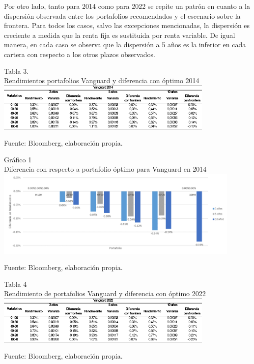 \documentclass[a4paper,fleqn]{cas-sc}
\begin{document}
Por otro lado, tanto para 2014 como para 2022 se repite un patrón en cuanto a la dispersión observada entre los portafolios recomendados y el escenario sobre la frontera. Para todos los casos, salvo las excepciones mencionadas, la dispersión es creciente a medida que la renta fija es sustituida por renta variable. De igual manera, en cada caso se observa que la dispersión a 5 años es la inferior en cada cartera con respecto a los otros plazos observados.

\begin{center}
    Tabla 3.\\
    Rendimientos portafolios Vanguard y diferencia con óptimo 2014\\
    \includegraphics[width=0.8\textwidth]{image/tabla3.png}

    \tiny Fuente: Bloomberg, elaboración propia.
\end{center}

\begin{center}
    Gráfico 1\\

    Diferencia con respecto a portafolio óptimo para Vanguard en 2014\\

	\includegraphics[width=0.9\textwidth]{image/imagen1.png}

	\tiny Fuente: Bloomberg, elaboración propia.
\end{center}

\begin{center}
    Tabla 4\\
    Rendimiento de portafolios Vanguard y diferencia con óptimo 2022\\

    \includegraphics[width=0.8\textwidth]{image/tabla4.png}

    \tiny Fuente: Bloomberg, elaboración propia.
\end{center}
\end{document}
